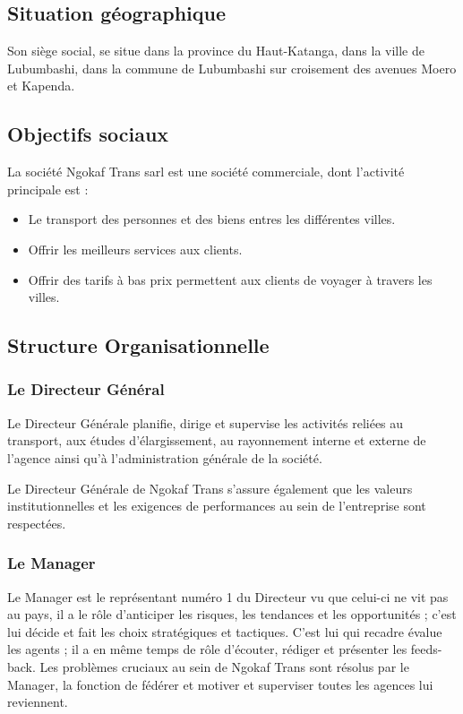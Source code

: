        \subsection[Situation géographique]{Situation géographique}
        Son siège social, se situe dans la province du Haut-Katanga, dans la ville de Lubumbashi,
        dans la commune de Lubumbashi sur croisement des avenues Moero et Kapenda.        

        \subsection[Objectifs sociaux]{Objectifs sociaux}
        La société Ngokaf Trans \acrshort{sarl} est une société commerciale,
        dont l’activité principale est :
        \par
        \begin{itemize}
            \setlength{\itemsep}{0pt}
            \item [\ding{226}] Le transport des personnes et des biens entres les différentes villes.
            \item [\ding{226}] Offrir les meilleurs services aux clients.
            \item [\ding{226}] Offrir des tarifs à bas prix permettent aux clients de voyager à travers les villes.
        \end{itemize}
        \subsection[Structure Organisationnelle]{Structure Organisationnelle}
            \subsubsection[Le Directeur Général]{Le Directeur Général}
            Le Directeur Générale planifie, dirige et supervise les activités reliées
            au transport, aux études d’élargissement, au rayonnement interne et externe
            de l’agence ainsi qu’à l’administration générale de la société.
            \par\noindent
            Le Directeur Générale de Ngokaf Trans s’assure également que les valeurs
            institutionnelles et les exigences de performances au sein de l’entreprise sont respectées.

            \subsubsection[Le Manager]{Le Manager}
            Le Manager est le représentant numéro 1 du Directeur vu que celui-ci ne vit pas au pays,
            il a le rôle d’anticiper les risques, les tendances et les opportunités ; c’est lui décide
            et fait les choix stratégiques et tactiques. C’est lui qui recadre évalue les agents ;
            il a en même temps de rôle d’écouter, rédiger et présenter les feeds-back.
            Les problèmes cruciaux au sein de Ngokaf Trans sont résolus par le Manager,
            la fonction de fédérer et motiver et superviser toutes les agences lui reviennent.


